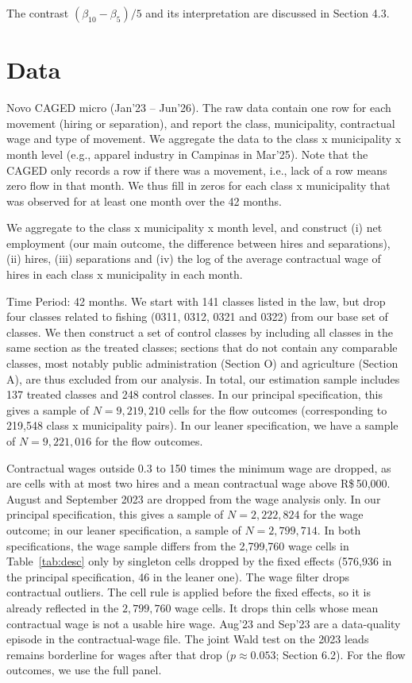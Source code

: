 \documentclass[12pt,a4paper]{article}
\begin{document}
The contrast $(\beta_{10}-\beta_5)/5$ and its interpretation are discussed in Section 4.3.

\section{Data}
\label{sec:dados}

Novo CAGED micro (Jan'23 -- Jun'26). The raw data contain one row for each movement (hiring or separation), and report the class, municipality, contractual wage and type of movement. We aggregate the data to the class x municipality x month level (e.g., apparel industry in Campinas in Mar'25). Note that the CAGED only records a row if there was a movement, i.e., lack of a row means zero flow in that month. We thus fill in zeros for each class x municipality that was observed for at least one month over the 42 months.

We aggregate to the class x municipality x month level, and construct (i) net employment (our main outcome, the difference between hires and separations), (ii) hires, (iii) separations and (iv) the log of the average contractual wage of hires in each class x municipality in each month.

Time Period: 42 months. We start with 141 classes listed in the law, but drop four classes related to fishing (0311, 0312, 0321 and 0322) from our base set of classes. We then construct a set of control classes by including all classes in the same section as the treated classes; sections that do not contain any comparable classes, most notably public administration (Section O) and agriculture (Section A), are thus excluded from our analysis. In total, our estimation sample includes 137 treated classes and 248 control classes. In our principal specification, this gives a sample of $N=9{,}219{,}210$ cells for the flow outcomes (corresponding to 219,548 class x municipality pairs). In our leaner specification, we have a sample of $N=9{,}221{,}016$ for the flow outcomes.


Contractual wages outside 0.3 to 150 times the minimum wage are dropped, as are cells with at most two hires and a mean contractual wage above R\$\,50{,}000. August and September 2023 are dropped from the wage analysis only. In our principal specification, this gives a sample of $N=2{,}222{,}824$ for the wage outcome; in our leaner specification, a sample of $N=2{,}799{,}714$. In both specifications, the wage sample differs from the 2,799,760 wage cells in Table~\ref{tab:desc} only by singleton cells dropped by the fixed effects (576,936 in the principal specification, 46 in the leaner one). The wage filter drops contractual outliers. The cell rule is applied before the fixed effects, so it is already reflected in the $2{,}799{,}760$ wage cells. It drops thin cells whose mean contractual wage is not a usable hire wage. Aug'23 and Sep'23 are a data-quality episode in the contractual-wage file. The joint Wald test on the 2023 leads remains borderline for wages after that drop ($p\approx0.053$; Section 6.2). For the flow outcomes, we use the full panel.
\end{document}
